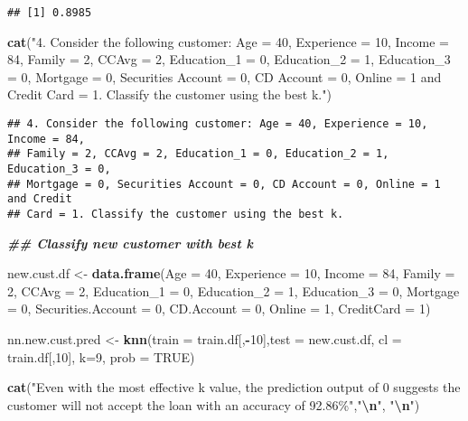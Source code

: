 \documentclass[
]{article}
\newenvironment{Shaded}{\begin{snugshade}}{\end{snugshade}}
\newcommand{\AttributeTok}[1]{\textcolor[rgb]{0.13,0.29,0.53}{#1}}
\newcommand{\ConstantTok}[1]{\textcolor[rgb]{0.56,0.35,0.01}{#1}}
\newcommand{\DecValTok}[1]{\textcolor[rgb]{0.00,0.00,0.81}{#1}}
\newcommand{\DocumentationTok}[1]{\textcolor[rgb]{0.56,0.35,0.01}{\textbf{\textit{#1}}}}
\newcommand{\FunctionTok}[1]{\textcolor[rgb]{0.13,0.29,0.53}{\textbf{#1}}}
\newcommand{\NormalTok}[1]{#1}
\newcommand{\OtherTok}[1]{\textcolor[rgb]{0.56,0.35,0.01}{#1}}
\newcommand{\SpecialCharTok}[1]{\textcolor[rgb]{0.81,0.36,0.00}{\textbf{#1}}}
\newcommand{\StringTok}[1]{\textcolor[rgb]{0.31,0.60,0.02}{#1}}
\begin{document}
\begin{verbatim}
## [1] 0.8985
\end{verbatim}

\begin{Shaded}
\begin{Highlighting}[]
\FunctionTok{cat}\NormalTok{(}\StringTok{"4. Consider the following customer: Age = 40, Experience = 10, Income = 84,}
\StringTok{Family = 2, CCAvg = 2, Education\_1 = 0, Education\_2 = 1, Education\_3 = 0,}
\StringTok{Mortgage = 0, Securities Account = 0, CD Account = 0, Online = 1 and Credit}
\StringTok{Card = 1. Classify the customer using the best k."}\NormalTok{)}
\end{Highlighting}
\end{Shaded}

\begin{verbatim}
## 4. Consider the following customer: Age = 40, Experience = 10, Income = 84,
## Family = 2, CCAvg = 2, Education_1 = 0, Education_2 = 1, Education_3 = 0,
## Mortgage = 0, Securities Account = 0, CD Account = 0, Online = 1 and Credit
## Card = 1. Classify the customer using the best k.
\end{verbatim}

\begin{Shaded}
\begin{Highlighting}[]
\DocumentationTok{\#\# Classify new customer with best k}

\NormalTok{new.cust.df }\OtherTok{\textless{}{-}} \FunctionTok{data.frame}\NormalTok{(}\AttributeTok{Age =} \DecValTok{40}\NormalTok{, }\AttributeTok{Experience =} \DecValTok{10}\NormalTok{, }\AttributeTok{Income =} \DecValTok{84}\NormalTok{, }\AttributeTok{Family =} \DecValTok{2}\NormalTok{, }\AttributeTok{CCAvg =} \DecValTok{2}\NormalTok{, }\AttributeTok{Education\_1 =} \DecValTok{0}\NormalTok{, }\AttributeTok{Education\_2 =} \DecValTok{1}\NormalTok{, }\AttributeTok{Education\_3 =} \DecValTok{0}\NormalTok{, }\AttributeTok{Mortgage =} \DecValTok{0}\NormalTok{, }\AttributeTok{Securities.Account =} \DecValTok{0}\NormalTok{, }\AttributeTok{CD.Account =} \DecValTok{0}\NormalTok{, }\AttributeTok{Online =} \DecValTok{1}\NormalTok{, }\AttributeTok{CreditCard =} \DecValTok{1}\NormalTok{)}

\NormalTok{nn.new.cust.pred }\OtherTok{\textless{}{-}} \FunctionTok{knn}\NormalTok{(}\AttributeTok{train =}\NormalTok{ train.df[,}\SpecialCharTok{{-}}\DecValTok{10}\NormalTok{],}\AttributeTok{test =}\NormalTok{ new.cust.df, }\AttributeTok{cl =}\NormalTok{ train.df[,}\DecValTok{10}\NormalTok{], }\AttributeTok{k=}\DecValTok{9}\NormalTok{, }\AttributeTok{prob =} \ConstantTok{TRUE}\NormalTok{)}


\FunctionTok{cat}\NormalTok{(}\StringTok{"Even with the most effective k value, the prediction output of \textquotesingle{}0\textquotesingle{} suggests the customer will not accept the loan with an accuracy of 92.86\%"}\NormalTok{,}\StringTok{"}\SpecialCharTok{\textbackslash{}n}\StringTok{"}\NormalTok{, }\StringTok{"}\SpecialCharTok{\textbackslash{}n}\StringTok{"}\NormalTok{)}
\end{Highlighting}
\end{Shaded}
\end{document}
